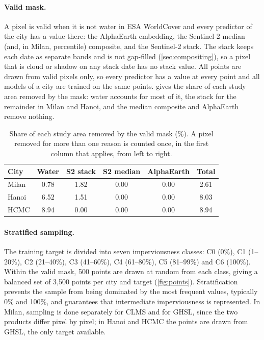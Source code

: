 \paragraph{Valid mask.} A pixel is valid when it is not water in ESA
WorldCover \cite{zanaga2022worldcover} and every predictor of the city has a
value there: the AlphaEarth embedding, the Sentinel-2 median (and, in Milan,
percentile) composite, and the Sentinel-2 stack. The stack keeps each date
as separate bands and is not gap-filled (\cref{sec:compositing}), so a pixel
that is cloud or shadow on any stack date has no stack value. All points
are drawn from valid pixels only, so every predictor has a value at every
point and all models of a city are trained on the same points.
 gives the share of each study area removed by the mask:
water accounts for most of it, the stack for the remainder in Milan and
Hanoi, and the median composite and AlphaEarth remove nothing.

\begin{table}[htbp]
  \centering
  \small
  \caption{Share of each study area removed by the valid mask (\%). A pixel
  removed for more than one reason is counted once, in the first column that
  applies, from left to right.}
  \label{tab:mask}
  \begin{tabular}{lccccc}
    \toprule
    City & Water & S2 stack & S2 median & AlphaEarth & Total \\
    \midrule
    Milan & 0.78 & 1.82 & 0.00 & 0.00 & 2.61 \\
    Hanoi & 6.52 & 1.51 & 0.00 & 0.00 & 8.03 \\
    HCMC  & 8.94 & 0.00 & 0.00 & 0.00 & 8.94 \\
    \bottomrule
  \end{tabular}
\end{table}

\paragraph{Stratified sampling.} The training target is divided into seven
imperviousness classes: C0 (0\%), C1 (1--20\%), C2 (21--40\%), C3 (41--60\%),
C4 (61--80\%), C5 (81--99\%) and C6 (100\%). Within the valid mask, 500
points are drawn at random from each class, giving a balanced set of
3{,}500 points per city and target (\cref{fig:points}). Stratification
prevents the sample from being dominated by the most frequent values,
typically 0\% and 100\%, and guarantees that intermediate imperviousness is
represented. In Milan, sampling is done separately for CLMS and for GHSL,
since the two products differ pixel by pixel; in Hanoi and HCMC the points
are drawn from GHSL, the only target available.

